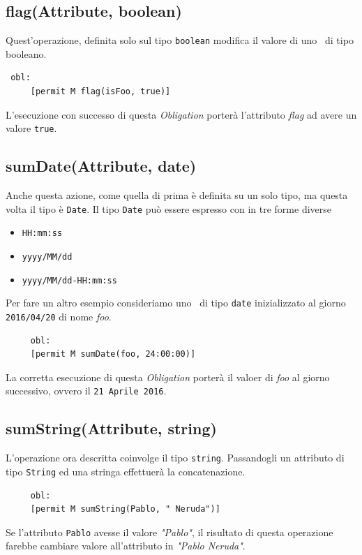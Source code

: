 \subsection*{flag(Attribute, boolean)} %
\label{ssub:opflag}
Quest'operazione, definita solo sul tipo \texttt{boolean} modifica il valore di uno \statusattribute \ di tipo booleano.
\begin{verbatim}
 obl:
     [permit M flag(isFoo, true)]
\end{verbatim}
L'esecuzione con successo di questa \textit{Obligation} porterà l'attributo \textit{flag} ad avere un valore \texttt{true}.

\subsection*{sumDate(Attribute, date)}
\label{ssub:opdate}

Anche questa azione, come quella di prima è definita su un solo tipo, ma questa volta il tipo è \texttt{Date}. Il tipo \texttt{Date} può essere espresso con in tre forme diverse
\begin{itemize}
\item{\texttt{HH:mm:ss}}
\item{\texttt{yyyy/MM/dd}}
\item{\texttt{yyyy/MM/dd-HH:mm:ss}}
\end{itemize}
Per fare un altro esempio consideriamo uno \statusattribute \ di tipo \texttt{date} inizializzato al giorno \texttt{2016/04/20} di nome \textit{foo}.
\begin{verbatim}
	 obl:
     [permit M sumDate(foo, 24:00:00)]
\end{verbatim}
La corretta esecuzione di questa \textit{Obligation} porterà il valoer di \textit{foo} al giorno successivo, ovvero il \texttt{21 Aprile 2016}.

\subsection*{sumString(Attribute, string)}
\label{ssub:opsumstring}

L'operazione ora descritta coinvolge il tipo \texttt{string}. Passandogli un attributo
di tipo \texttt{String} ed una stringa effettuerà la concatenazione.
\begin{verbatim}
	 obl:
     [permit M sumString(Pablo, " Neruda")]
\end{verbatim}
Se l'attributo \texttt{Pablo} avesse il valore \textit{"Pablo"}, il risultato di questa operazione farebbe cambiare valore all'attributo in \textit{"Pablo Neruda"}.

